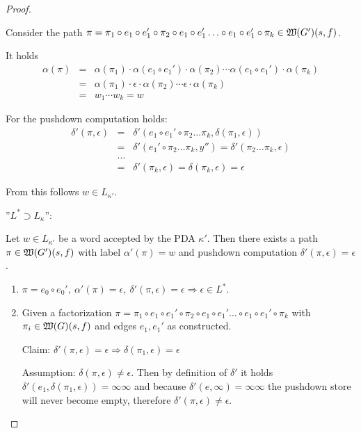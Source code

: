 \begin{proof}
\begin{enumerate}
  Consider the path $\pi = \pi_1 \circ e_1 \circ e_1' \circ \pi_2 \circ e_1
  \circ e_1' \ldots \circ e_1 \circ e_1' \circ \pi_k \in \mbox{$\mathfrak{W}(G')$}(s,
  f)$.
  
  It holds
  \begin{eqnarray*}
  \alpha(\pi) &=& \alpha(\pi_1) \cdot \alpha(e_1 \circ e_1') \cdot \alpha(\pi_2)
  \cdots \alpha(e_1 \circ e_1') \cdot \alpha(\pi_k) \\
  &=& \alpha(\pi_1) \cdot \epsilon \cdot \alpha(\pi_2) \cdots \epsilon \cdot
  \alpha(\pi_k)  \\
  &=& w_1 \cdots w_k = w
  \end{eqnarray*}
  
  For the pushdown computation holds:
  \begin{eqnarray*}
  \delta'(\pi, \epsilon) &=& \delta'(e_1 \circ e_1' \circ \pi_2 \ldots \pi_k,
  \delta(\pi_1, \epsilon)) \\
  &=& \delta'(e_1' \circ \pi_2 \ldots \pi_k, y'') = \delta'(\pi_2 \ldots \pi_k,
  \epsilon) \\
  &\ldots& \\
  &=& \delta'(\pi_k, \epsilon) = \delta(\pi_k, \epsilon) = \epsilon
  \end{eqnarray*}
 
  From this follows $w \in L_{\kappa'}$.
\end{enumerate} 
 
''$L^* \supset L_{\kappa}$'':

Let $w \in L_{\kappa'}$ be a word accepted by the PDA $\kappa'$. Then there
exists a path $\pi \in \mbox{$\mathfrak{W}(G')$}(s, f)$ with label $\alpha'(\pi) = w$
and pushdown computation $\delta'(\pi, \epsilon) = \epsilon$.

\begin{enumerate}
  \item $\pi = e_0 \circ e_0',\ \alpha'(\pi) = \epsilon,\ \delta'(\pi, \epsilon)
  = \epsilon \Rightarrow \epsilon \in L^*$.
  
  \item Given a factorization $\pi = \pi_1 \circ e_1 \circ e_1' \circ \pi_2 \circ e_1
  \circ e_1' \ldots \circ e_1 \circ e_1' \circ \pi_k$ with $\pi_i \in
  \mbox{$\mathfrak{W}(G)$}(s, f)$ and edges $e_1, e_1'$ as constructed.
  
  Claim: $\delta'(\pi, \epsilon) = \epsilon \Rightarrow \delta(\pi_1, \epsilon)
  = \epsilon$
  
  Assumption: $\delta(\pi, \epsilon) \neq \epsilon$. Then by definition of
  $\delta'$ it holds $\delta'(e_1, \delta(\pi_1, \epsilon)) = \infty\infty$ and
  because $\delta'(e, \infty) = \infty\infty$ the pushdown store will never
  become empty, therefore $\delta'(\pi, \epsilon) \neq \epsilon$.
  

\end{enumerate}
\end{proof}

